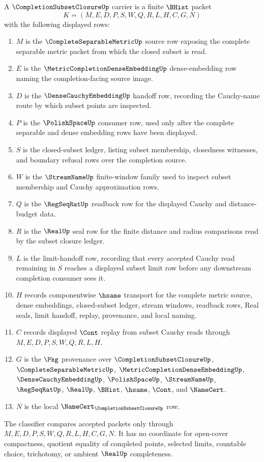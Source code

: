 \begin{definition}
\label{def:completion-subset-closure-carrier}
A $\CompletionSubsetClosureUp$ carrier is a finite $\BHist$ packet
$$
K=(M,E,D,P,S,W,Q,R,L,H,C,G,N)
$$
with the following displayed rows:
\begin{enumerate}
\item $M$ is the $\CompleteSeparableMetricUp$ source row exposing the complete separable metric packet from which the closed subset is read.
\item $E$ is the $\MetricCompletionDenseEmbeddingUp$ dense-embedding row naming the completion-facing source image.
\item $D$ is the $\DenseCauchyEmbeddingUp$ handoff row, recording the Cauchy-name route by which subset points are inspected.
\item $P$ is the $\PolishSpaceUp$ consumer row, used only after the complete separable and dense embedding rows have been displayed.
\item $S$ is the closed-subset ledger, listing subset membership, closedness witnesses, and boundary refusal rows over the completion source.
\item $W$ is the $\StreamNameUp$ finite-window family used to inspect subset membership and Cauchy approximation rows.
\item $Q$ is the $\RegSeqRatUp$ readback row for the displayed Cauchy and distance-budget data.
\item $R$ is the $\RealUp$ seal row for the finite distance and radius comparisons read by the subset closure ledger.
\item $L$ is the limit-handoff row, recording that every accepted Cauchy read remaining in $S$ reaches a displayed subset limit row before any downstream completion consumer sees it.
\item $H$ records componentwise $\hsame$ transport for the complete metric source, dense embeddings, closed-subset ledger, stream windows, readback rows, Real seals, limit handoff, replay, provenance, and local naming.
\item $C$ records displayed $\Cont$ replay from subset Cauchy reads through $M,E,D,P,S,W,Q,R,L,H$.
\item $G$ is the $\Pkg$ provenance over $\CompletionSubsetClosureUp$, $\CompleteSeparableMetricUp$, $\MetricCompletionDenseEmbeddingUp$, $\DenseCauchyEmbeddingUp$, $\PolishSpaceUp$, $\StreamNameUp$, $\RegSeqRatUp$, $\RealUp$, $\BHist$, $\hsame$, $\Cont$, and $\NameCert$.
\item $N$ is the local $\NameCert_{\CompletionSubsetClosureUp}$ row.
\end{enumerate}
The classifier compares accepted packets only through $M,E,D,P,S,W,Q,R,L,H,C,G,N$. It has no coordinate for open-cover compactness, quotient equality of completed points, selected limits, countable choice, trichotomy, or ambient $\RealUp$ completeness.
\end{definition}


